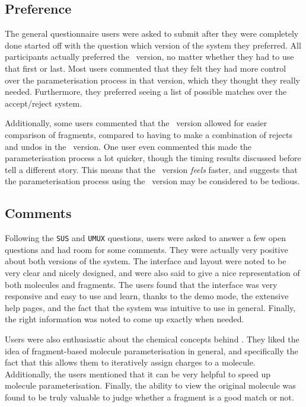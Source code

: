 \subsection{Preference}
The general questionnaire users were asked to submit after they were completely done started off with the question which version of the system they preferred. All participants actually preferred the \IDa\ version, no matter whether they had to use that first or last. Most users commented that they felt they had more control over the parameterisation process in that version, which they thought they really needed. Furthermore, they preferred seeing a list of possible matches over the accept/reject system.

Additionally, some users commented that the \IDa\ version allowed for easier comparison of fragments, compared to having to make a combination of rejects and undos in the \IDb\ version. One user even commented this made the parameterisation process a lot quicker, though the timing results discussed before tell a different story. This means that the \IDa\ version \emph{feels} faster, and suggests that the parameterisation process using the \IDb\ version may be considered to be tedious.


\subsection{Comments}
Following the \verb|SUS| and \verb|UMUX| questions, users were asked to answer a few open questions and had room for some comments.  They were actually very positive about both versions of the system. The interface and layout were noted to be very clear and nicely designed, and were also said to give a nice representation of both molecules and fragments. The users found that the interface was very responsive and easy to use and learn, thanks to the demo mode, the extensive help pages, and the fact that the system was intuitive to use in general. Finally, the right information was noted to come up exactly when needed.

Users were also enthusiastic about the chemical concepts behind \oframp. They liked the idea of fragment-based molecule parameterisation in general, and specifically the fact that this allows them to iteratively assign charges to a molecule. Additionally, the users mentioned that it can be very helpful to speed up molecule parameterisation. Finally, the ability to view the original molecule was found to be truly valuable to judge whether a fragment is a good match or not.

